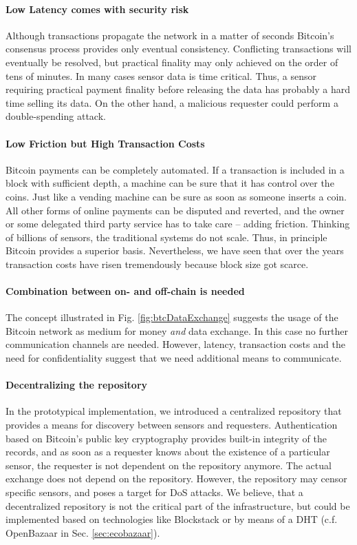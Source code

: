 \paragraph{Low Latency comes with security risk}

Although transactions propagate the network in a matter of seconds Bitcoin's consensus process provides only eventual consistency. Conflicting transactions will eventually be resolved, but practical finality may only achieved on the order of tens of minutes. In many cases sensor data is time critical. Thus, a sensor requiring practical payment finality before releasing the data has probably a hard time selling its data. On the other hand, a malicious requester could perform a double-spending attack. 

\paragraph{Low Friction but High Transaction Costs}

Bitcoin payments can be completely automated. If a transaction is included in a block with sufficient depth, a machine can be sure that it has control over the coins. Just like a vending machine can be sure as soon as someone inserts a coin.  All other forms of online payments can be disputed and reverted, and the owner or some delegated third party service has to take care -- adding friction. Thinking of billions of sensors, the traditional systems do not scale. Thus, in principle Bitcoin provides a superior basis. Nevertheless, we have seen that over the years transaction costs have risen tremendously because block size got scarce.

\paragraph{Combination between on- and off-chain is needed}

The concept illustrated in Fig. \ref{fig:btcDataExchange} suggests the usage of the Bitcoin network as medium for money \emph{and} data exchange. In this case no further communication channels are needed. However, latency, transaction costs and the need for confidentiality suggest that we need additional means to communicate. 

\paragraph{Decentralizing the repository}
In the prototypical implementation, we introduced a centralized repository that provides a means for discovery between sensors and requesters. Authentication based on Bitcoin's public key cryptography provides built-in integrity of the records, and as soon as a requester knows about the existence of a particular sensor, the requester is not dependent on the repository anymore. The actual exchange does not depend on the repository. However, the repository may censor specific sensors, and poses a target for \ac{DoS} attacks. We believe, that a decentralized repository is not the critical part of the infrastructure, but could be implemented based on technologies like Blockstack \parencite{ali2016blockstack} or by means of a \ac{DHT} (c.f. OpenBazaar in Sec. \ref{sec:ecobazaar}).


